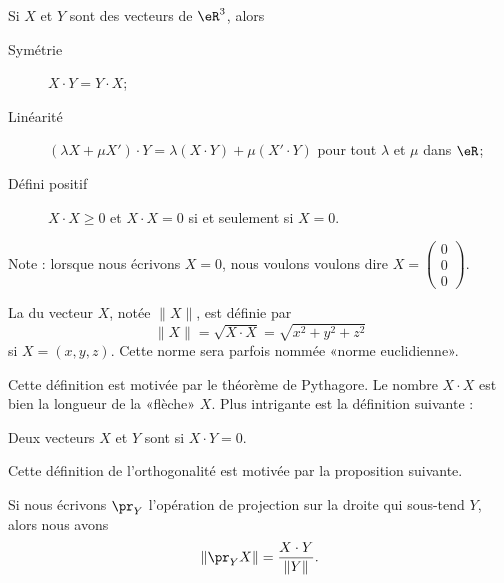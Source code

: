 \begin{proposition}
	Si $X$ et $Y$ sont des vecteurs de $\eR^3$, alors
	\begin{description}
		\item[Symétrie] $X\cdot Y=Y\cdot X$;
		\item[Linéarité] $(\lambda X+\mu X')\cdot Y=\lambda(X\cdot Y)+\mu(X'\cdot Y)$ pour tout $\lambda$ et $\mu$ dans $\eR$;
		\item[Défini positif] $X\cdot X\geq 0$ et $X\cdot X=0$ si et seulement si $X=0$.
	\end{description}
\end{proposition}
Note : lorsque nous écrivons $X=0$, nous voulons voulons dire $X=\begin{pmatrix}
	0	\\ 
	0	\\ 
	0	
\end{pmatrix}$.


\begin{definition}
	La  du vecteur $X$, notée $\| X \|$, est définie par 
	\begin{equation}
		\| X \|=\sqrt{X\cdot X}=\sqrt{x^2+y^2+z^2}
	\end{equation}
	si $X=(x,y,z)$. Cette norme sera parfois nommée «norme euclidienne».
\end{definition}
Cette définition est motivée par le théorème de Pythagore. Le nombre $X\cdot X$ est bien la longueur de la «flèche» $X$. Plus intrigante est la définition suivante :
\begin{definition}
	Deux vecteurs $X$ et $Y$ sont  si $X\cdot Y=0$. 
\end{definition}
Cette définition de l'orthogonalité est motivée par la proposition suivante.

\begin{proposition}		\label{PropProjScal}
	Si nous écrivons $\pr_Y$  l'opération de projection sur la droite qui sous-tend $Y$, alors nous avons
	\begin{equation}
		\| \pr_YX \|=\frac{ X\cdot Y }{ \| Y \| }.
	\end{equation}
\end{proposition}

